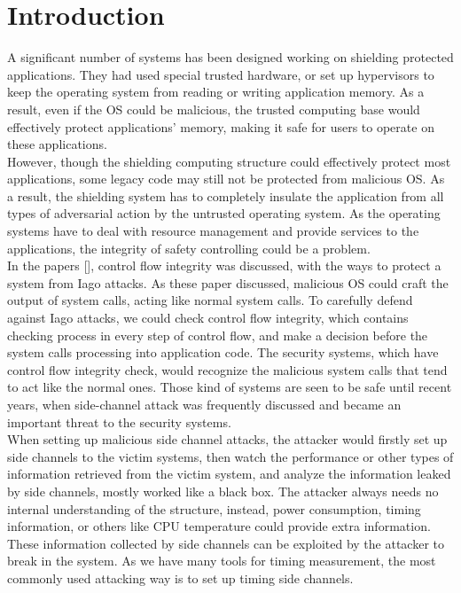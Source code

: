 \documentclass{sig-alternate}
\begin{document}


\section{Introduction}
A significant number of systems has been designed working on shielding protected applications. They had used special trusted hardware, or set up hypervisors to keep the operating system from reading or writing application memory. As a result, even if the OS could be malicious, the trusted computing base would effectively protect applications' memory, making it safe for users to operate on these applications.
\\
\indent
However, though the shielding computing structure could effectively protect most applications, some legacy code may still not be protected from malicious OS. As a result, the shielding system has to completely insulate the application from all types of adversarial action by the untrusted operating system. As the operating systems have to deal with resource management and provide services to the applications, the integrity of safety controlling could be a problem. 
\\
\indent
In the papers [], control flow integrity was discussed, with the ways to protect a system from Iago attacks. As these paper discussed, malicious OS could craft the output of system calls, acting like normal system calls. To carefully defend against Iago attacks, we could check control flow integrity, which contains checking process in every step of control flow, and make a decision before the system calls processing into application code. The security systems, which have control flow integrity check, would recognize the malicious system calls that tend to act like the normal ones. Those kind of systems are seen to be safe until recent years, when side-channel attack was frequently discussed and became an important threat to the security systems.
\\
\indent
When setting up malicious side channel attacks, the attacker would firstly set up side channels to the victim systems, then watch the performance or other types of information retrieved from the victim system, and analyze the information leaked by side channels, mostly worked like a black box. The attacker always needs no internal understanding of the structure, instead, power consumption, timing information, or others like CPU temperature could provide extra information. These information collected by side channels can be exploited by the attacker to break in the system. As we have many tools for timing measurement, the most commonly used attacking way is to set up timing side channels.
\end{document}
